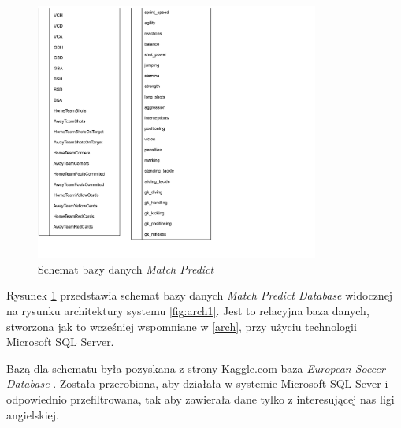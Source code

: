 \begin{figure}[h]
\ContinuedFloat
    \centering
  \includegraphics[width=0.83\textwidth]{figures/match_predict_schema_2.png}%
  \addtocounter{figure}{1}
  \caption{Schemat bazy danych \textit{Match Predict}}
    
  \label{fig:match_predict_schema}
    
\end{figure}
 
\noindent Rysunek \ref{fig:match_predict_schema} przedstawia schemat bazy danych \textit{Match Predict Database} widocznej na rysunku architektury systemu \ref{fig:arch1}. Jest to relacyjna baza danych, stworzona jak to wcześniej wspomniane w \ref{arch}, przy użyciu technologii Microsoft SQL Server.

Bazą dla schematu była pozyskana z strony Kaggle.com baza \textit{European Soccer Database} \cite{kagggle_european_soccer_database}. Została przerobiona, aby działała w systemie Microsoft SQL Sever i odpowiednio przefiltrowana, tak aby zawierała dane tylko z interesującej nas ligi angielskiej.

